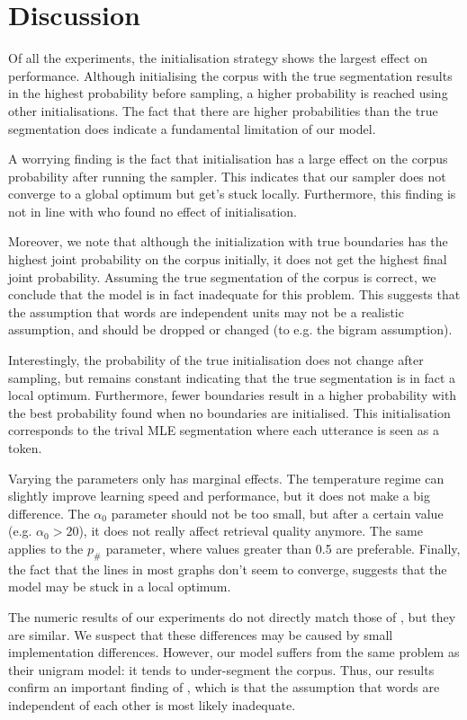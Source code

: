 \section{Discussion}

Of all the experiments, the initialisation strategy shows the largest effect on performance. Although initialising the corpus with the true segmentation results in the highest probability before sampling, a higher probability is reached using other initialisations. The fact that there are higher probabilities than the true segmentation does indicate a fundamental limitation of our model.

A worrying finding is the fact that initialisation has a large effect on the corpus probability after running the sampler. This indicates that our sampler does not converge to a global optimum but get's stuck locally. Furthermore, this finding is not in line with \cite{Goldwater200921} who found no effect of initialisation. 

Moreover, we note that although the initialization with true boundaries has the highest joint probability on the corpus initially, it does not get the highest final joint probability. Assuming the true segmentation of the corpus is correct, we conclude that the model is in fact inadequate for this problem. This suggests that the assumption that words are independent units may not be a realistic assumption, and should be dropped or changed (to e.g. the bigram assumption). 

Interestingly, the probability of the true initialisation does not change after sampling, but remains constant indicating that the true segmentation is in fact a local optimum. Furthermore, fewer boundaries result in a higher probability with the best probability found when no boundaries are initialised. This initialisation corresponds to the trival MLE segmentation where each utterance is seen as a token.

Varying the parameters only has marginal effects. The temperature regime can slightly improve learning speed and performance, but it does not make a big difference. The $\alpha_0$ parameter should not be too small, but after a certain value (e.g. $\alpha_0 > 20$), it does not really affect retrieval quality anymore. The same applies to the $p_\#$ parameter, where values greater than 0.5 are preferable. Finally, the fact that the lines in most graphs don't seem to converge, suggests that the model may be stuck in a local optimum.

The numeric results of our experiments do not directly match those of \cite{Goldwater200921}, but they are similar. We suspect that these differences may be caused by small implementation differences. However, our model suffers from the same problem as their unigram model: it tends to under-segment the corpus. Thus, our results confirm an important finding of \cite{Goldwater200921}, which is that the assumption that words are independent of each other is most likely inadequate.

